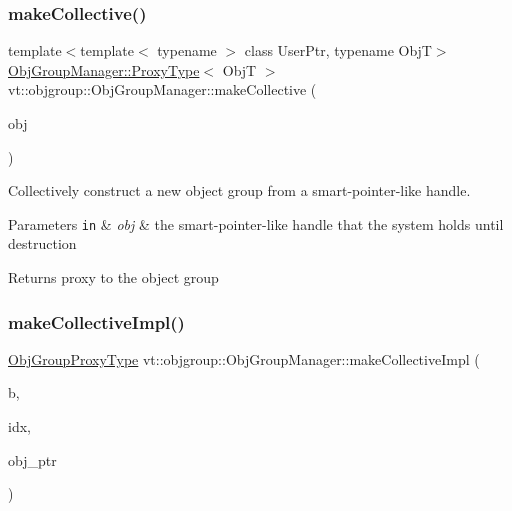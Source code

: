 \subsubsection{\texorpdfstring{make\+Collective()}{makeCollective()}\hspace{0.1cm}{\footnotesize\ttfamily [5/5]}}
{\footnotesize\ttfamily template$<$template$<$ typename $>$ class User\+Ptr, typename ObjT$>$ \\
\hyperlink{structvt_1_1objgroup_1_1_obj_group_manager_aea65eef52f240a52210132eef5ce591f}{Obj\+Group\+Manager\+::\+Proxy\+Type}$<$ ObjT $>$ vt\+::objgroup\+::\+Obj\+Group\+Manager\+::make\+Collective (\begin{DoxyParamCaption}\item[{User\+Ptr$<$ ObjT $>$}]{obj }\end{DoxyParamCaption})}



Collectively construct a new object group from a smart-\/pointer-\/like handle. 


\begin{DoxyParams}[1]{Parameters}
\mbox{\tt in}  & {\em obj} & the smart-\/pointer-\/like handle that the system holds until destruction\\
\hline
\end{DoxyParams}
\begin{DoxyReturn}{Returns}
proxy to the object group 
\end{DoxyReturn}
\mbox{\label{structvt_1_1objgroup_1_1_obj_group_manager_ab9885f22f148479bb68f3a59a147cdec}} 
\subsubsection{\texorpdfstring{make\+Collective\+Impl()}{makeCollectiveImpl()}}
{\footnotesize\ttfamily \hyperlink{namespacevt_ad7cae989df485fccca57f0792a880a8e}{Obj\+Group\+Proxy\+Type} vt\+::objgroup\+::\+Obj\+Group\+Manager\+::make\+Collective\+Impl (\begin{DoxyParamCaption}\item[{\hyperlink{structvt_1_1objgroup_1_1_obj_group_manager_ac1e9bb19d4a5923dd6d595bad28f04c9}{Holder\+Base\+Ptr\+Type}}]{b,  }\item[{\hyperlink{namespacevt_1_1objgroup_a378e4b966221779c74f3a2f921eb2421}{Obj\+Type\+Idx\+Type}}]{idx,  }\item[{void $\ast$}]{obj\+\_\+ptr }\end{DoxyParamCaption})\hspace{0.3cm}{\ttfamily [private]}}



